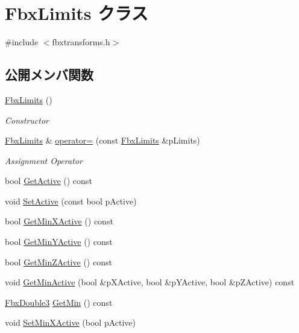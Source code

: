 \hypertarget{class_fbx_limits}{}\section{Fbx\+Limits クラス}
\label{class_fbx_limits}


{\ttfamily \#include $<$fbxtransforms.\+h$>$}

\subsection*{公開メンバ関数}
\begin{DoxyCompactItemize}
\item 
\hyperlink{class_fbx_limits_a19b22bfab7e355c4d02cea76fa5a0716}{Fbx\+Limits} ()
\begin{DoxyCompactList}\small\item\em Constructor \end{DoxyCompactList}\item 
\hyperlink{class_fbx_limits}{Fbx\+Limits} \& \hyperlink{class_fbx_limits_ae59422fb31755035d02b272e74b9e518}{operator=} (const \hyperlink{class_fbx_limits}{Fbx\+Limits} \&p\+Limits)
\begin{DoxyCompactList}\small\item\em Assignment Operator \end{DoxyCompactList}\item 
bool \hyperlink{class_fbx_limits_a2225bf4117f0c8c7cd99f74390ad26e3}{Get\+Active} () const
\item 
void \hyperlink{class_fbx_limits_a9250fab25f1f8cf5e64651073ad8a327}{Set\+Active} (const bool p\+Active)
\item 
bool \hyperlink{class_fbx_limits_a2eb90034a35d752ab84c1fd2ae5ae254}{Get\+Min\+X\+Active} () const
\item 
bool \hyperlink{class_fbx_limits_a1dbd5286be843c07799ad0c5c0296345}{Get\+Min\+Y\+Active} () const
\item 
bool \hyperlink{class_fbx_limits_afd07bd7e174be42570ce976146bbba48}{Get\+Min\+Z\+Active} () const
\item 
void \hyperlink{class_fbx_limits_af9f15f72a7e0be4f1244c14bb1af6e50}{Get\+Min\+Active} (bool \&p\+X\+Active, bool \&p\+Y\+Active, bool \&p\+Z\+Active) const
\item 
\hyperlink{fbxtypes_8h_ae0a96f14cde566774c7553aa7523b7a7}{Fbx\+Double3} \hyperlink{class_fbx_limits_a9c58030943ee716e37374c7ec77c7283}{Get\+Min} () const
\item 
void \hyperlink{class_fbx_limits_a1023b7037e317e7f9346e07c70896de8}{Set\+Min\+X\+Active} (bool p\+Active)

\end{DoxyCompactItemize}
